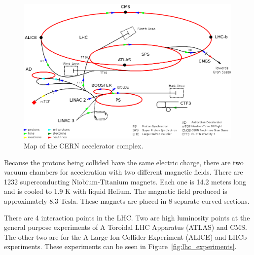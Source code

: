 \begin{figure}[htb]
\centering
\includegraphics[width=0.99\textwidth]{Experiment/1024px-Cern-accelerator-complex.png}
\caption{Map of the CERN accelerator complex.\cite{CERN_complex}}
\label{fig:lhc_schematic}
\end{figure}

Because the protons being collided have the same electric charge, there are two vacuum chambers for acceleration with two different magnetic fields. There are 1232 superconducting Niobium-Titanium magnets. Each one is 14.2 meters long and is cooled to 1.9 K with liquid Helium. The magnetic field produced is approximately 8.3 Tesla. These magnets are placed in 8 separate curved sections.

There are 4 interaction points in the LHC.  Two are high luminosity points at the general purpose experiments of A Toroidal LHC Apparatus (ATLAS) \cite{ATLASExperiment} and CMS. The other two are for the A Large Ion Collider Experiment (ALICE) \cite{ALICEExperiment}  and LHCb \cite{LHCbExperiment} experiments. These experiments can be seen in Figure~\ref{fig:lhc_experiments}.








